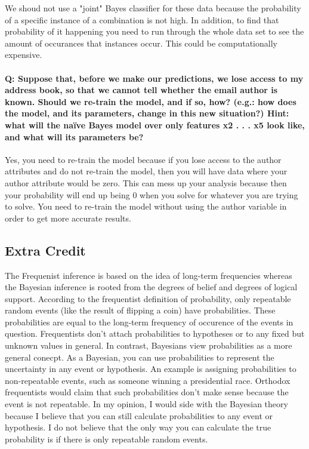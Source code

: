 \documentclass[11pt]{article}
\begin{document}
    We shoud not use a "joint" Bayes classifier for these data because the
probability of a specific instance of a combination is not high. In
addition, to find that probability of it happening you need to run
through the whole data set to see the amount of occurances that
instances occur. This could be computationally expensive.

    \paragraph{Q: Suppose that, before we make our predictions, we lose
access to my address book, so that we cannot tell whether the email
author is known. Should we re-train the model, and if so, how? (e.g.:
how does the model, and its parameters, change in this new situation?)
Hint: what will the naïve Bayes model over only features x2 . . . x5
look like, and what will its parameters
be?}\label{q-suppose-that-before-we-make-our-predictions-we-lose-access-to-my-address-book-so-that-we-cannot-tell-whether-the-email-author-is-known.-should-we-re-train-the-model-and-if-so-how-e.g.-how-does-the-model-and-its-parameters-change-in-this-new-situation-hint-what-will-the-nauxefve-bayes-model-over-only-features-x2-.-.-.-x5-look-like-and-what-will-its-parameters-be}

    Yes, you need to re-train the model because if you lose access to the
author attributes and do not re-train the model, then you will have data
where your author attribute would be zero. This can mess up your
analysis because then your probability will end up being 0 when you
solve for whatever you are trying to solve. You need to re-train the
model without using the author variable in order to get more accurate
results.

    \subsection{Extra Credit}\label{extra-credit}

    The Frequenist inference is based on the idea of long-term frequencies
whereas the Bayesian inference is rooted from the degrees of belief and
degrees of logical support. According to the frequentist definition of
probability, only repeatable random events (like the result of flipping
a coin) have probabilities. These probabilities are equal to the
long-term frequency of occurence of the events in question. Frequentists
don't attach probabilities to hypotheses or to any fixed but unknown
values in general. In contrast, Bayesians view probabilities as a more
general conecpt. As a Bayesian, you can use probabilities to represent
the uncertainty in any event or hypothesis. An example is assigning
probabilities to non-repeatable events, such as someone winning a
presidential race. Orthodox frequentists would claim that such
probabilities don't make sense because the event is not repeatable. In
my opinion, I would side with the Bayesian theory because I believe that
you can still calculate probabilities to any event or hypothesis. I do
not believe that the only way you can calculate the true probability is
if there is only repeatable random events.
\end{document}
